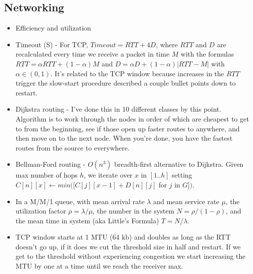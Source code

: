 \documentclass{scrartcl}
\begin{document}
\subsection*{Networking}
\begin{itemize}
\item Efficiency and utilization
\item Timeout (S) - For TCP, $Timeout = RTT + 4D$, where $RTT$ and $D$ are
recalculated every time we receive a packet in time $M$ with the formulas
$RTT=\alpha RTT + (1-\alpha)M$ and $D=\alpha D+(1-\alpha)|RTT-M|$ with
$\alpha \in (0,1)$. It's related to the TCP window because increases in the $RTT$
trigger the slow-start procedure described a couple bullet points down to
restart.
\item Dijkstra routing - I've done this in 10 different classes by this point.
Algorithm is to work through the nodes in order of which are cheapest to get to
from the beginning, see if those open up faster routes to anywhere, and then
move on to the next node. When you're done, you have the fastest routes from
the source to everywhere.
\item Bellman-Ford routing - $O(n^3)$ breadth-first alternative to Dijkstra.
Given max number of hops $h$, we iterate over $x$ in $[1..h]$ setting $C[n][x]
\leftarrow min([C[j][x-1] + D[n][j]$ for $j$ in $G])$.
\item In a M/M/1 queue, with mean arrival rate $\lambda$ and mean service rate
$\mu$, the utilization factor $\rho =\lambda/\mu$, the number in the system
$N =\rho/(1-\rho)$, and the mean time in system (aka Little's Formula)
$T=N/\lambda$.
\item TCP window starts at 1 MTU (64 kb) and doubles as long as the RTT doesn't
go up, if it does we cut the threshold size in half and restart. If we get to
the threshold without experiencing congestion we start increasing the MTU by
one at a time until we reach the receiver max.
\end{itemize}
\end{document}
